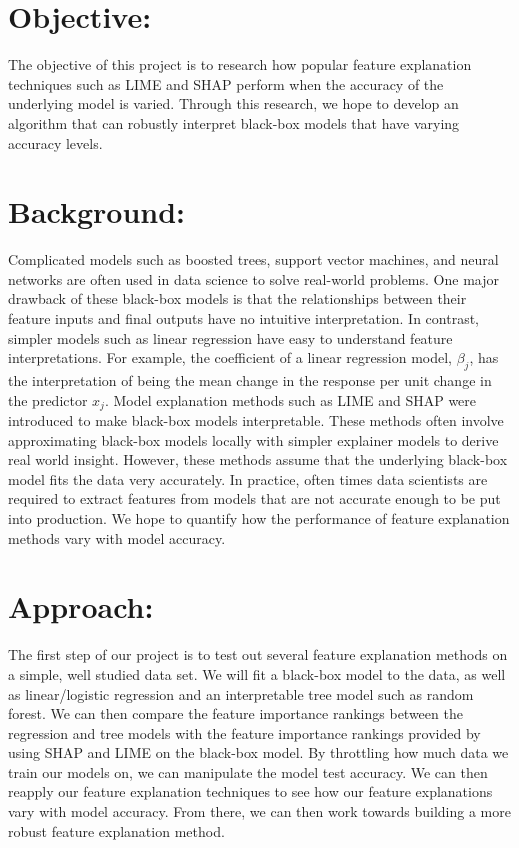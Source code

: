 \documentclass{article}
\begin{document}
    \begin{normalsize}
    
    	\section{Objective:}
       The objective of this project is to research how popular feature explanation techniques such as LIME and SHAP perform when the accuracy of the underlying model is varied. Through this research, we hope to develop an algorithm that can robustly interpret black-box models that have varying accuracy levels.
          \\
      
		\section{Background:}
       Complicated models such as boosted trees, support vector machines, and neural networks are often used in data science to solve real-world problems. One major drawback of these black-box models is that the relationships between their feature inputs and final outputs have no intuitive interpretation. In contrast, simpler models such as linear regression have easy to understand feature interpretations. For example, the coefficient of a linear regression model, $\beta_{j}$, has the interpretation of being the mean change in the response per unit change in the predictor $x_{j}$. Model explanation methods such as LIME and SHAP were introduced to make black-box models interpretable. These methods often involve approximating black-box models locally with simpler explainer models to derive real world insight. However, these methods assume that the underlying black-box model fits the data very accurately. In practice, often times data scientists are required to extract features from models that are not accurate enough to be put into production. We hope to quantify how the performance of feature explanation methods vary with model accuracy.
        
	   	\section{Approach:}
    The first step of our project is to test out several feature explanation methods on a simple, well studied data set. We will fit a black-box model to the data, as well as linear/logistic regression and an interpretable tree model such as random forest. We can then compare the feature importance rankings between the regression and tree models with the feature importance rankings provided by using SHAP and LIME on the black-box model. By throttling how much data we train our models on, we can manipulate the model test accuracy. We can then reapply our feature explanation techniques to see how our feature explanations vary with model accuracy. From there, we can then work towards building a more robust feature explanation method. 
        

\end{normalsize}
\end{document}
